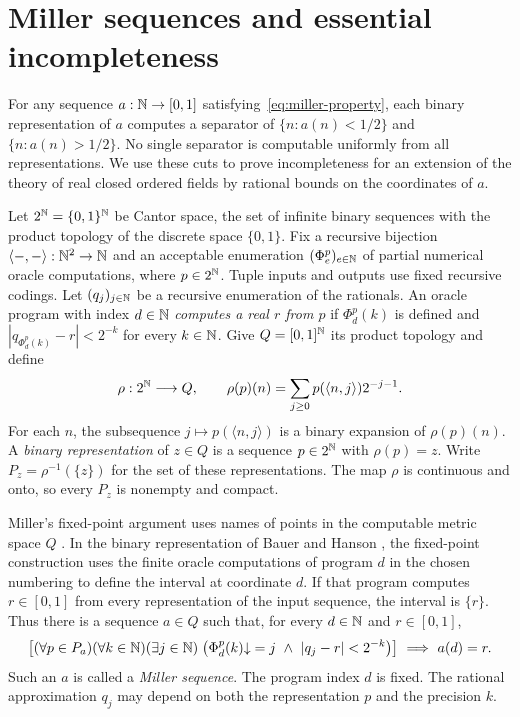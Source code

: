 \section{Miller sequences and essential incompleteness}\label{sec:miller}

For any sequence $a:\mathbb N\to[0,1]$ satisfying~\eqref{eq:miller-property},
each binary representation of $a$ computes a separator of $\{n:a(n)<1/2\}$ and $\{n:a(n)>1/2\}$. No single
separator is computable uniformly from all representations. We use
these cuts to prove incompleteness for an extension of the theory of
real closed ordered fields by rational bounds on the coordinates of $a$.

Let $2^{\mathbb N}=\{0,1\}^{\mathbb N}$ be Cantor space, the set of infinite binary
sequences with the product topology of the discrete space $\{0,1\}$.
Fix a recursive bijection $\langle-,-\rangle:\mathbb N^2\to\mathbb N$ and an
acceptable enumeration $(\Phi_e^p)_{e\in\mathbb N}$ of partial numerical
oracle computations, where $p\in2^{\mathbb N}$. Tuple inputs and outputs use
fixed recursive codings. Let $(q_j)_{j\in\mathbb N}$ be a recursive enumeration
of the rationals. An oracle program with index $d\in\mathbb N$
\emph{computes a real $r$ from $p$}
if $\Phi_d^p(k)$ is defined and
$|q_{\Phi_d^p(k)}-r|<2^{-k}$ for every $k\in\mathbb N$.
Give $Q=[0,1]^{\mathbb N}$ its product topology and define
\[
 \rho:2^{\mathbb N}\longrightarrow Q,\qquad
 \rho(p)(n)=\sum_{j\geq0}p(\langle n,j\rangle)2^{-j-1}.
\]
For each $n$, the subsequence $j\mapsto p(\langle n,j\rangle)$
is a binary expansion of $\rho(p)(n)$.
A \emph{binary representation} of $z\in Q$ is a sequence
$p\in2^{\mathbb N}$ with $\rho(p)=z$. Write
$P_z=\rho^{-1}(\{z\})$ for the set of these representations.
The map $\rho$ is continuous and onto, so every $P_z$ is nonempty
and compact.

Miller's fixed-point argument uses names of points in the computable
metric space $Q$ \cite[proof of Theorem~6.3 and the following paragraph]{Miller2004}.
In the binary representation of Bauer and Hanson
\cite[pp.~6--9, (2.2), Definition~2.1 and Theorem~2.2]{BauerHanson},
the fixed-point construction uses the finite oracle computations of
program $d$ in the chosen numbering to define the interval at coordinate
$d$. If that program computes $r\in[0,1]$ from every representation
of the input sequence, the interval is $\{r\}$. Thus there is a
sequence $a\in Q$ such that, for every $d\in\mathbb N$ and $r\in[0,1]$,
\begin{equation}\label{eq:miller-property}
 \left[
  (\forall p\in P_a)(\forall k\in\mathbb N)(\exists j\in\mathbb N)\;
  \bigl(\Phi_d^p(k)\mathord\downarrow=j
       \ \land\ |q_j-r|<2^{-k}\bigr)
 \right]\ \Longrightarrow\ a(d)=r.
\end{equation}
Such an $a$ is called a \emph{Miller sequence}. The program index $d$
is fixed. The rational approximation $q_j$ may depend on both the
representation $p$ and the precision $k$.

